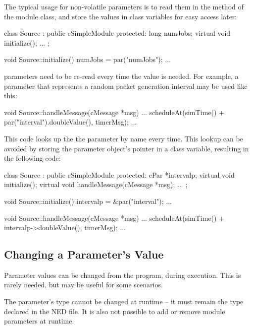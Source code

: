 The typical usage for non-volatile parameters is to read them in the
 method of the module class, and store the values
in class variables for easy access later:

\begin{cpp}
class Source : public cSimpleModule
{
  protected:
    long numJobs;
    virtual void initialize();
    ...
};

void Source::initialize()
{
    numJobs = par("numJobs");
    ...
}
\end{cpp}

 parameters need to be re-read every time the value is needed.
For example, a parameter that represents a random packet generation interval
may be used like this:

\begin{cpp}
void Source::handleMessage(cMessage *msg)
{
    ...
    scheduleAt(simTime() + par("interval").doubleValue(), timerMsg);
    ...
}
\end{cpp}

This code looks up the the parameter by name every time. This lookup
can be avoided by storing the parameter object's pointer in a class variable,
resulting in the following code:

\begin{cpp}
class Source : public cSimpleModule
{
  protected:
    cPar *intervalp;
    virtual void initialize();
    virtual void handleMessage(cMessage *msg);
    ...
};

void Source::initialize()
{
    intervalp = &par("interval");
    ...
}

void Source::handleMessage(cMessage *msg)
{
    ...
    scheduleAt(simTime() + intervalp->doubleValue(), timerMsg);
    ...
}
\end{cpp}


\subsection{Changing a Parameter's Value}
\label{sec:simple-modules:setting-parameters}

Parameter values can be changed from the program, during execution.
This is rarely needed, but may be useful for some scenarios.

\begin{note}
    The parameter's type cannot be changed at runtime -- it must
    remain the type declared in the NED file. It is also not possible
    to add or remove module parameters at runtime.
\end{note}

